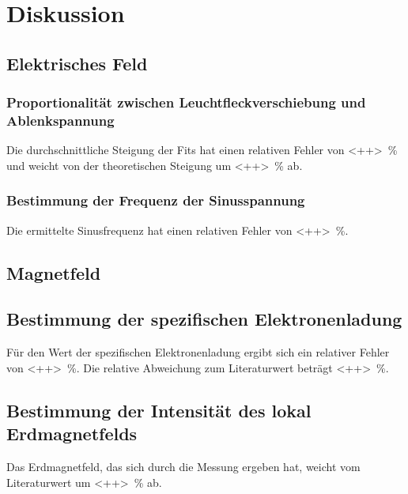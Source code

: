 \section{Diskussion}
\label{sec:Diskussion}

\subsection{Elektrisches Feld}


\subsubsection{Proportionalität zwischen Leuchtfleckverschiebung und Ablenkspannung}

Die durchschnittliche Steigung der Fits hat einen relativen Fehler von \SI{<++>}{\percent} und weicht von der theoretischen Steigung um \SI{<++>}{\percent} ab. 

\subsubsection{Bestimmung der Frequenz der Sinusspannung}

Die ermittelte Sinusfrequenz hat einen relativen Fehler von \SI{<++>}{\percent}.

\subsection{Magnetfeld}


\subsection{Bestimmung der spezifischen Elektronenladung}

Für den Wert der spezifischen Elektronenladung ergibt sich ein relativer Fehler von \SI{<++>}{\percent}. Die relative Abweichung zum Literaturwert beträgt \SI{<++>}{\percent}. 

\subsection{Bestimmung der Intensität des lokal Erdmagnetfelds}

Das Erdmagnetfeld, das sich durch die Messung ergeben hat, weicht vom Literaturwert um \SI{<++>}{\percent} ab. 

